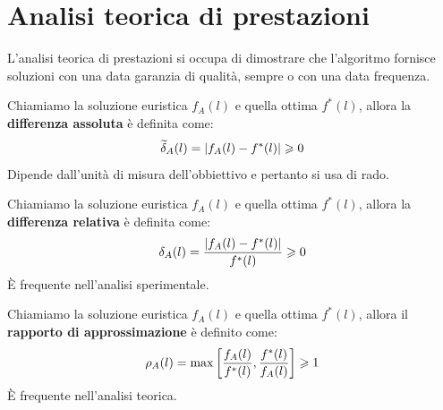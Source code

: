 \documentclass[\main/main.tex]{subfiles}
\begin{document}
\chapter{Analisi teorica di prestazioni}
\begin{multicols}{2}
\begin{observation}
    L'analisi teorica di prestazioni si occupa di dimostrare che l'algoritmo fornisce soluzioni con una data garanzia di qualità, sempre o con una data frequenza.
\end{observation}
\begin{definition}
Chiamiamo la soluzione euristica \(f_A(l)\) e quella ottima \(f^*(l)\), allora la \textbf{differenza assoluta} è definita come:
  \[
    \widetilde{\delta}_A(l) = \left\lvert f_A(l) - f^*(l)\right\rvert \geqslant 0
  \]
  Dipende dall'unità di misura dell'obbiettivo e pertanto si usa di rado.
\end{definition}

\begin{definition}
Chiamiamo la soluzione euristica \(f_A(l)\) e quella ottima \(f^*(l)\), allora la  \textbf{differenza relativa} è definita come:
  \[
    \delta_A(l) = \frac{\left\lvert f_A(l) - f^*(l)\right\rvert}{f^*(l)} \geqslant 0
  \]
  È frequente nell'analisi sperimentale.
\end{definition}

\begin{definition}
Chiamiamo la soluzione euristica \(f_A(l)\) e quella ottima \(f^*(l)\), allora il  \textbf{rapporto di approssimazione} è definito come:
  \[
    \rho_A(l) = \max \left[\frac{f_A(l)}{f^*(l)}, \frac{f^*(l)}{f_A(l)}\right] \geqslant 1
  \]
  È frequente nell'analisi teorica.
\end{definition}
\end{multicols}
\end{document}
